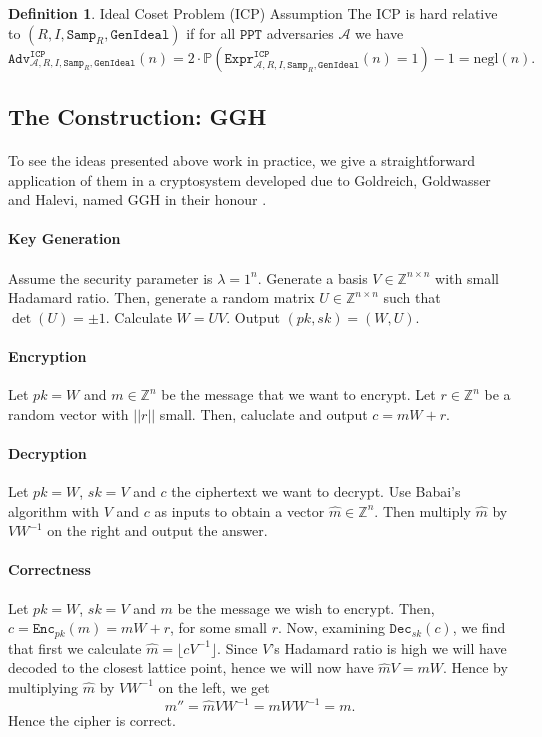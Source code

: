 \documentclass{article}
\theoremstyle{definition}
\newtheorem{definition}{Definition}[section]
\theoremstyle{example}
\newcommand{\Enc}{\texttt{Enc}}
\newcommand{\Dec}{\texttt{Dec}}
\newcommand{\A}{\mathcal{A}}
\newcommand{\Prob}{\mathbb{P}}
\newcommand{\Int}{\mathbb{Z}}
\newcommand{\PPT}{\texttt{PPT}}
\newcommand{\negl}{\text{negl}}
\newcommand{\Expr}[2]{\texttt{Expr}^{\texttt{#1}}_{#2}}
\newcommand{\Adv}[2]{\texttt{Adv}^{\texttt{#1}}_{#2}}
\newcommand{\GenIdeal}{\texttt{GenIdeal}}
\newcommand{\Samp}{\texttt{Samp}}
\newcommand{\norm}[1]{||#1||}
\begin{document}
\begin{definition}{Ideal Coset Problem (ICP) Assumption}
  The ICP is hard relative to $(R,I,\Samp_R,\GenIdeal)$ if for all $\PPT$ adversaries $\A$ we have
  \[
    \Adv{ICP}{\A, R, I, \Samp_R, \GenIdeal}(n) = 2 \cdot \Prob(\Expr{ICP}{\A, R,
      I, \Samp_R, \GenIdeal}(n) = 1) - 1 = \negl(n).
  \]
\end{definition}
\subsection{The Construction: GGH}
\paragraph{} To see the ideas presented above work in practice, we give a
straightforward application of them in a cryptosystem developed due to
Goldreich, Goldwasser and Halevi, named GGH in their honour \cite{goldreich1997public}.
\paragraph{Key Generation}
\paragraph{} Assume the security parameter is $\lambda = 1^n$. Generate a basis
$V \in \Int^{n\times n}$ with small Hadamard ratio. Then, generate a random matrix
$U \in \Int^{n\times n}$ such that $\det(U) = \pm 1$. Calculate $W = UV$. Output
$(pk, sk) = (W, U)$.
\paragraph{Encryption}
Let $pk = W$ and $m \in \Int^n$ be the message that we want to encrypt. Let $r
\in \Int^n$ be a random vector with $\norm{r}$ small. Then, caluclate and output
$c = mW + r$.
\paragraph{Decryption}
Let $pk = W$, $sk = V$ and $c$ the ciphertext we want to decrypt. Use Babai's
algorithm with $V$ and $c$ as inputs to obtain a vector $\hat{m} \in \Int^n$. Then multiply
$\hat{m}$ by $VW^{-1}$ on the right and output the answer.
\paragraph{Correctness}
Let $pk = W$, $sk = V$ and $m$ be the message we wish to encrypt. Then, $c =
\Enc_{pk}(m) = mW + r$, for some small $r$. Now, examining $\Dec_{sk}(c)$, we
find that first we calculate $\hat{m} = \lfloor cV^{-1} \rfloor$. Since $V$'s
Hadamard ratio is high we will have decoded to the closest lattice point, hence
we will now have $\hat{m}V = mW$. Hence by multiplying $\hat{m}$ by $VW^{-1}$ on
the left, we get
\[
  m'' = \hat{m}VW^{-1} = mWW^{-1} = m.
\]
Hence the cipher is correct.
\end{document}
